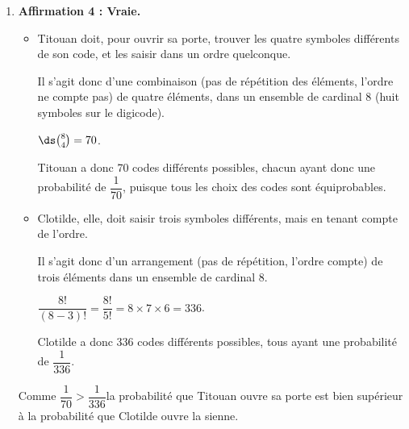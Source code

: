 \begin{enumerate}
\begin{enumerate}
			En utilisant la définition trigonométrique du produit scalaire, on a :

			$\vectt{CA}\cdot\vectt{CB} = \mathrm{CA} \times \mathrm{CB} \times \cos\left(\widehat{\mathrm{ACB}}\right)$.

			En remplaçant les valeurs connues, on a :\quad $6,75 = 4,5 \times 4,5 \times \cos\left(\widehat{\mathrm{ACB}}\right)$,

			ce qui équivaut à \quad $\cos\left(\widehat{\mathrm{ACB}}\right) = \dfrac{6,75}{4,5^2} = \dfrac{1}{3}$.

			On en déduit :\quad $\widehat{\mathrm{ACB}} = \arccos\left(\dfrac{1}{3}\right) \approx 70,53$\,\textdegree.

			On a donc bien $\widehat{\mathrm{ACB}} \approx 70,5$\,\textdegree, à $10^{-1}$ près.
		\end{enumerate}

		\item \textbf{Affirmation 4 : Vraie.}

		\begin{itemize}[label=\textbullet~]
			\item Titouan doit, pour ouvrir sa porte, trouver les quatre symboles différents de son code, et les saisir dans un ordre quelconque.

			Il s'agit donc d'une combinaison (pas de répétition des éléments, l'ordre ne compte pas) de quatre éléments, dans un ensemble de cardinal 8 (huit symboles sur le digicode).

			$\ds \binom{8}{4} = 70$.

			Titouan a donc 70 codes différents possibles, chacun ayant donc une probabilité de $\dfrac{1}{70}$, puisque tous les choix des codes sont équiprobables.
			\item Clotilde, elle, doit saisir trois symboles différents, mais en tenant compte de l'ordre.

			Il s'agit donc d'un arrangement (pas de répétition, l'ordre compte) de trois éléments dans un ensemble de cardinal 8.

			$ \dfrac{8!}{(8-3)!} = \dfrac{8!}{5!} = 8\times 7 \times 6 = 336$.

			Clotilde a donc 336 codes différents possibles, tous ayant une probabilité de $\dfrac{1}{336}$.
		\end{itemize}

		Comme \quad $\dfrac{1}{70} > \dfrac{1}{336}$\quad la probabilité que Titouan ouvre sa porte est bien supérieur à la probabilité que Clotilde ouvre la sienne.
	\end{enumerate}
